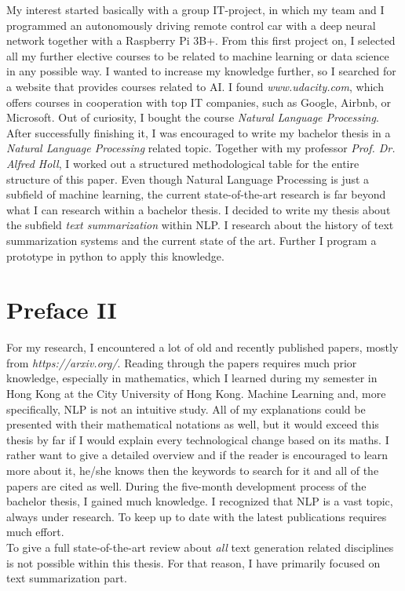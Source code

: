 My interest started basically with a group IT-project, in which my team and I programmed an autonomously driving remote control car with a deep neural network together with a Raspberry Pi 3B+. From this first project on, I selected all my further elective courses to be related to machine learning or data science in any possible way. I wanted to increase my knowledge further, so I searched for a website that provides courses related to AI. I found \textit{www.udacity.com}, which offers courses in cooperation with top IT companies, such as Google, Airbnb, or Microsoft. Out of curiosity, I bought the course \textit{Natural Language Processing}. After successfully finishing it, I was encouraged to write my bachelor thesis in a \textit{Natural Language Processing} related topic. 
Together with my professor \textit{Prof. Dr. Alfred Holl}, I worked out a structured methodological table for the entire structure of this paper. 
Even though Natural Language Processing is just a subfield of machine learning, the current state-of-the-art research is far beyond what I can research within a bachelor thesis. I decided to write my thesis about the subfield \textit{text summarization} within NLP. I research about the history of text summarization systems and the current state of the art.
Further I program a prototype in python to apply this knowledge.
\null\newpage

\section*{Preface II}
\label{sec:prolog_2}
For my research, I encountered a lot of old and recently published papers, mostly from \textit{https://arxiv.org/}. 
Reading through the papers requires much prior knowledge, especially in mathematics, which I learned during my semester in Hong Kong at the City University of Hong Kong. 
Machine Learning and, more specifically, NLP is not an intuitive study. All of my explanations could be presented with their mathematical notations as well, but it would exceed this thesis by far if I would explain every technological change based on its maths. I rather want to give a detailed overview and if the reader is encouraged to learn more about it, he/she knows then the keywords to search for it and all of the papers are cited as well.
During the five-month development process of the bachelor thesis, I gained much knowledge. I recognized that NLP is a vast topic, always under research. To keep up to date with the latest publications requires much effort. \\
To give a full state-of-the-art review about \textit{all} text generation related disciplines is not possible within this thesis. For that reason, I have primarily focused on text summarization part.




